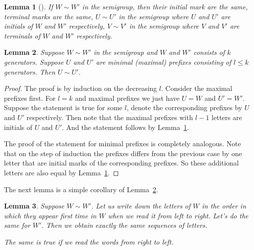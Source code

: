 \documentclass[11pt,letterpaper]{article}
\newtheorem{lemma}{Lemma}
\begin{document}
\begin{lemma}[\cite{GreenR52}] \label{lem:GR}
If $W\sim W'$ in the semigroup, then their initial mark are the same, terminal marks are the same, $U \sim U'$ in the semigroup where $U$ and $U'$ are initials of $W$ and $W'$ respectively, $V\sim V'$ in the semigroup where $V$ and $V'$ are terminals of $W$ and $W'$ respectively.
\end{lemma}

\begin{lemma} \label{lem:prefix_equivalence}
Suppose $W\sim W'$ in the semigroup and $W$ and $W'$ consists of $k$ generators. Suppose $U$ and $U'$ are minimal (maximal) prefixes consisting of $l\leq k$ generators. Then $U\sim U'$.
\end{lemma}

\begin{proof}
The proof is by induction on the decreasing $l$. Consider the maximal prefixes first. For $l=k$ and maximal prefixes we just have $U= W$ and $U'=W'$. Suppose the statement is true for some $l$, denote the corresponding prefixes by $U$ and $U'$ respectively. Then note that the maximal prefixes with $l-1$ letters are initials of $U$ and $U'$. And the statement follows by Lemma~\ref{lem:GR}.

The proof of the statement for minimal prefixes is completely analogous. Note that on the step of induction the prefixes differs from the previous case by one letter that are  initial marks of the corresponding prefixes. So these additional letters are also equal by Lemma~\ref{lem:GR}.
\end{proof}

The next lemma is a simple corollary of Lemma~\ref{lem:prefix_equivalence}.
\begin{lemma} \label{lem:variables_order}
Suppose $W \sim W'$. Let us write down the letters of $W$ in the order in which they appear first time in $W$ when we read it from left to right. Let's do the same for $W'$. Then we obtain exactly the same sequences of letters.

The same is true if we read the words from right to left.
\end{lemma}
\end{document}

